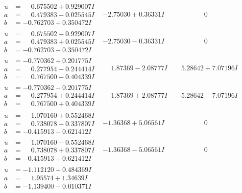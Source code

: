 \documentclass[1p]{elsarticle_modified}
\theoremstyle{definition}
\begin{document}
$$\begin{array}{c|c|c}
\begin{aligned}
u &= \phantom{-}0.675502 + 0.929007 I \\
a &= \phantom{-}0.479383 - 0.025545 I \\
b &= -0.762703 + 0.350472 I\end{aligned}
 & -2.75030 + 0.36331 I & \phantom{-0.000000 } 0 \\ \hline\begin{aligned}
u &= \phantom{-}0.675502 - 0.929007 I \\
a &= \phantom{-}0.479383 + 0.025545 I \\
b &= -0.762703 - 0.350472 I\end{aligned}
 & -2.75030 - 0.36331 I & \phantom{-0.000000 } 0 \\ \hline\begin{aligned}
u &= -0.770362 + 0.201775 I \\
a &= \phantom{-}0.277954 - 0.244414 I \\
b &= \phantom{-}0.767500 - 0.404339 I\end{aligned}
 & \phantom{-}1.87369 - 2.08777 I & \phantom{-}5.28642 + 7.07196 I \\ \hline\begin{aligned}
u &= -0.770362 - 0.201775 I \\
a &= \phantom{-}0.277954 + 0.244414 I \\
b &= \phantom{-}0.767500 + 0.404339 I\end{aligned}
 & \phantom{-}1.87369 + 2.08777 I & \phantom{-}5.28642 - 7.07196 I \\ \hline\begin{aligned}
u &= \phantom{-}1.070160 + 0.552468 I \\
a &= \phantom{-}0.738078 - 0.337807 I \\
b &= -0.415913 - 0.621412 I\end{aligned}
 & -1.36368 + 5.06561 I & \phantom{-0.000000 } 0 \\ \hline\begin{aligned}
u &= \phantom{-}1.070160 - 0.552468 I \\
a &= \phantom{-}0.738078 + 0.337807 I \\
b &= -0.415913 + 0.621412 I\end{aligned}
 & -1.36368 - 5.06561 I & \phantom{-0.000000 } 0 \\ \hline\begin{aligned}
u &= -1.112120 + 0.484369 I \\
a &= \phantom{-}1.95574 + 1.34639 I \\
b &= -1.139400 + 0.010371 I\end{aligned}

\end{array}$$
\end{document}
